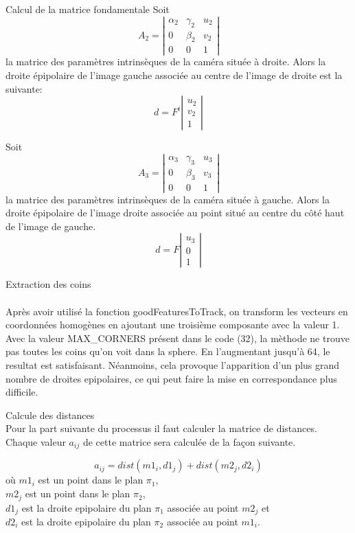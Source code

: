 \documentclass[a4paper,10pt]{article}
\begin{document}
\begin{paragraph}{Calcul de la matrice fondamentale}
Soit 
$$
A_2=
\left|
 \begin{array}{ccc}
    \alpha_{2} & \gamma_{2} &  	u_{2} \\
    0 & 	\beta_{2} &   	v_{2} \\
    0 & 	0 & 		1
 \end{array}
\right|
$$
la matrice des paramètres intrinsèques de la caméra située à droite. Alors la droite épipolaire de l'image gauche associée au centre de l'image de droite est la suivante:
$$
d=F^{t} 
\left|
\begin{array}{c}
    u_{2} \\
    v_{2} \\
    1
 \end{array}
\right|
$$

Soit 
$$
A_3=
\left|
 \begin{array}{ccc}
    \alpha_{3} & \gamma_{3} &  	u_{3} \\
    0 & 	\beta_{3} &   	v_{3} \\
    0 & 	0 & 		1
 \end{array}
\right|
$$
la matrice des paramètres intrinsèques de la caméra située à gauche. Alors la droite épipolaire de l'image droite associée au point situé au centre du côté haut de l'image de gauche.
$$
d=F
\left|
\begin{array}{c}
    u_{3} \\
    0 \\
    1
 \end{array}
\right|
$$
  
\end{paragraph}

\begin{paragraph}{Extraction des coins}~ \\
\\
Après avoir utilisé la fonction goodFeaturesToTrack, on transform les vecteurs en coordonnées homogènes en ajoutant une troisième composante avec la valeur 1.
\\
Avec la valeur MAX\_CORNERS présent dans le code (32), la mèthode ne trouve pas toutes les coins qu'on voit dans la sphere. En l'augmentant jusqu'à 64, le resultat est satisfaisant. Néanmoins, cela provoque l'apparition d'un plus grand nombre de droites epipolaires, ce qui peut faire la mise en correspondance plus difficile.
\end{paragraph}


\begin{paragraph}{Calcule des distances}~ \\
Pour la part suivante du processus il faut calculer la matrice de distances. Chaque valeur $a_{ij}$ de cette matrice sera calculée de la façon suivante.

$$
a_{ij}=dist(m1_{i}, d1_{j})+dist(m2_{j}, d2_{i})  
$$ 
où $m1_{i}$ est un point dans le plan $\pi_{1}$, 
\\$m2_{j}$ est un point dans le plan $\pi_{2}$, 
\\$d1_{j}$ est la droite epipolaire du plan $\pi_{1}$ associée au point $m2_{j}$ et 
\\$d2_{i}$ est la droite epipolaire du plan $\pi_{2}$ associée au point $m1_{i}$.
\end{paragraph}
\end{document}
